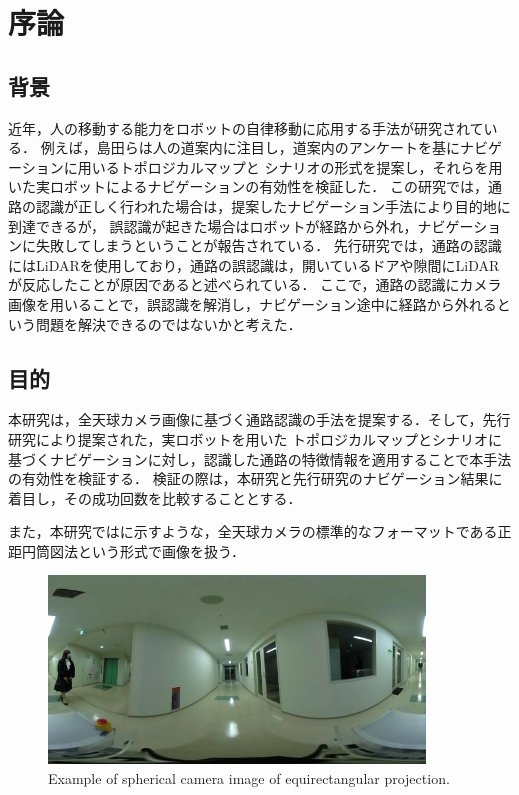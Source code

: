 \documentclass[../main]{subfiles}
\begin{document}
    \setcounter{secnumdepth}{2}
    \chapter{序論}
        \section{背景}
        近年，人の移動する能力をロボットの自律移動に応用する手法が研究されている．
        例えば，島田らは人の道案内に注目し，道案内のアンケートを基にナビゲーションに用いるトポロジカルマップと
        シナリオの形式を提案し，それらを用いた実ロボットによるナビゲーションの有効性を検証した．
        この研究では，通路の認識が正しく行われた場合は，提案したナビゲーション手法により目的地に到達できるが，
        誤認識が起きた場合はロボットが経路から外れ，ナビゲーションに失敗してしまうということが報告されている．
        先行研究では，通路の認識にはLiDARを使用しており，通路の誤認識は，開いているドアや隙間にLiDARが反応したことが原因であると述べられている．
        ここで，通路の認識にカメラ画像を用いることで，誤認識を解消し，ナビゲーション途中に経路から外れるという問題を解決できるのではないかと考えた．

        \newpage

        \section{目的}
        本研究は，全天球カメラ画像に基づく通路認識の手法を提案する．そして，先行研究により提案された，実ロボットを用いた
        トポロジカルマップとシナリオに基づくナビゲーションに対し，認識した通路の特徴情報を適用することで本手法の有効性を検証する．
        検証の際は，本研究と先行研究のナビゲーション結果に着目し，その成功回数を比較することとする．


        また，本研究ではに示すような，全天球カメラの標準的なフォーマットである正距円筒図法という形式で画像を扱う．

        \begin{figure}[H]
            \centering
            \includegraphics[width=10cm]{../images/18F_aisle_exp.jpg}
            \caption{Example of spherical camera image of equirectangular projection.}
            \label{figure::image_exp}
        \end{figure}
        
\end{document}
